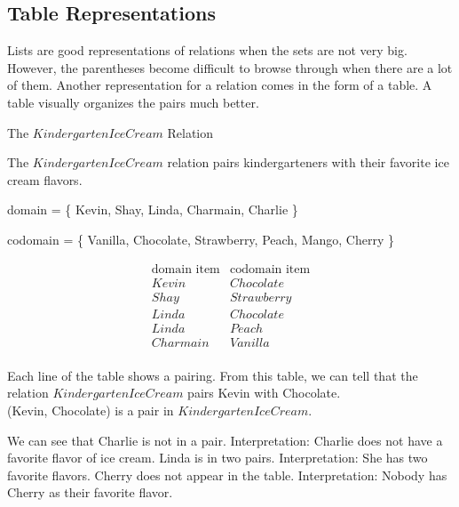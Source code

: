 \documentclass{ximera}
\begin{document}
\hfill\break





\subsection*{Table Representations}

\hfill\break

Lists are good representations of relations when the sets are not very big. However, the parentheses become difficult to browse through when there are a lot of them. Another representation for a relation comes in the form of a table. A table visually organizes the pairs much better.

\begin{example} The $KindergartenIceCream$ Relation


The $KindergartenIceCream$ relation pairs kindergarteners with their favorite ice cream flavors.

domain = \{ Kevin, Shay, Linda, Charmain, Charlie \}  

codomain = \{ Vanilla, Chocolate, Strawberry, Peach, Mango, Cherry \} 

\[
\begin{array}{l|l}
    \text{domain item}      & \text{codomain item}      \\ \hline
    Kevin   &  Chocolate \\
    Shay   & Strawberry \\
    Linda  &  Chocolate \\
    Linda  &  Peach \\
    Charmain &  Vanilla \\ 
\end{array}
\]


Each line of the table shows a pairing. From this table, we can tell that the relation $KindergartenIceCream$ pairs Kevin with Chocolate.  \\(Kevin, Chocolate) is a pair in $KindergartenIceCream$.

We can see that Charlie is not in a pair.  Interpretation: Charlie does not have a favorite flavor of ice cream. Linda is in two pairs.  Interpretation: She has two favorite flavors.  Cherry does not appear in the table. Interpretation: Nobody has Cherry as their favorite flavor.

\end{example} 
\end{document}
